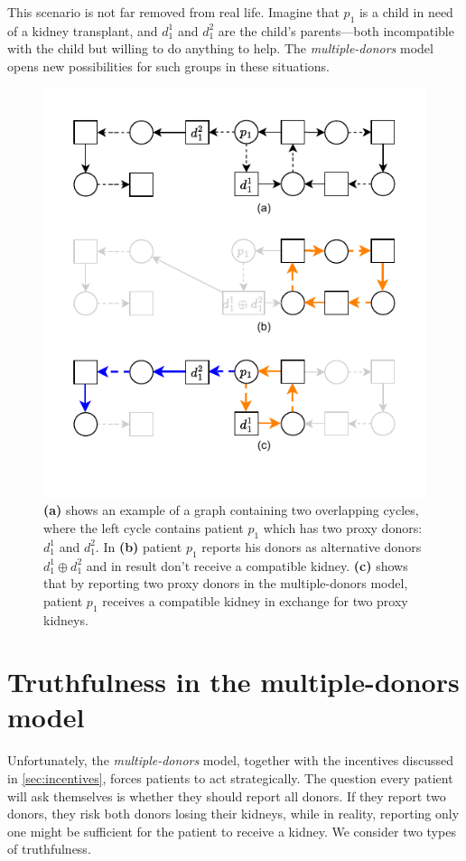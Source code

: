This scenario is not far removed from real life. Imagine that $p_1$ is a child in need of a kidney transplant, and $d_1^1$ and $d_1^2$ are the child’s parents—both incompatible with the child but willing to do anything to help. The \textit{multiple-donors} model opens new possibilities for such groups in these situations.

\begin{figure}
    \centering
    \includegraphics{data/incentive_motivation_example2.pdf}
    \caption[An example showing the benefit of reporting two proxy donors in multiple-donors model]{\textbf{(a)} shows an example of a graph containing two overlapping cycles, where the left cycle contains patient $p_1$ which has two proxy donors: $d_1^1$ and $d_1^2$. In \textbf{(b)} patient $p_1$ reports his donors as alternative donors $d_1^1 \oplus d_1^2$ and in result don't receive a compatible kidney. \textbf{(c)} shows that by reporting two proxy donors in the multiple-donors model, patient $p_1$ receives a compatible kidney in exchange for two proxy kidneys.}
    \label{fig:incentive_motivation_example2}
\end{figure}

\section{Truthfulness in the multiple-donors model}
Unfortunately, the \textit{multiple-donors} model, together with the incentives discussed in \autoref{sec:incentives}, forces patients to act strategically. The question every patient will ask themselves is whether they should report all donors. If they report two donors, they risk both donors losing their kidneys, while in reality, reporting only one might be sufficient for the patient to receive a kidney. We consider two types of truthfulness.

